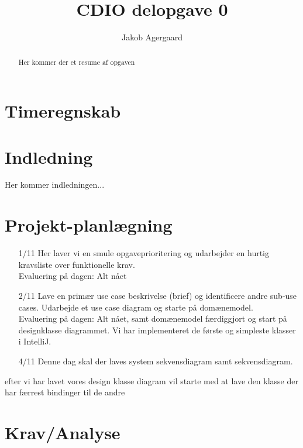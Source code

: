 \documentclass{article}
\title{CDIO delopgave 0}
\author{Jakob Agergaard}
\begin{document}
\titlespacing{\section}
    {0pt}{2em}{1em}



\normalsize
\begin{abstract}
     Her kommer der et resume af opgaven
\end{abstract}

\tableofcontents

\section{Timeregnskab}

\section{Indledning}

Her kommer indledningen...

\section{Projekt-planlægning}
\begin{itemize}
    \item [1/11] Her laver vi en smule opgaveprioritering og udarbejder en hurtig kravsliste over funktionelle krav.\\
    Evaluering på dagen: Alt nået
    \item [2/11] Lave en primær use case beskrivelse (brief) og identificere andre sub-use cases. Udarbejde et use case diagram og starte på domænemodel.\\
    Evaluering på dagen: Alt nået, samt domænemodel færdiggjort og start på designklasse diagrammet. Vi har implementeret de første og simpleste klasser i IntelliJ.
    \item [4/11] Denne dag skal der laves system sekvensdiagram samt sekvensdiagram.
    
\end{itemize}
efter vi har lavet vores design klasse diagram vil starte med at lave den klasse der har færrest bindinger til de andre 


\section{Krav/Analyse}
\end{document}
